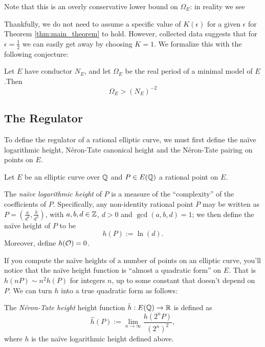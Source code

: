 \documentclass[10pt]{article}
\begin{document}
Note that this is an overly conservative lower bound on $\Omega_E$: in reality we see

Thankfully, we do not need to assume a specific value of $K(\epsilon)$ for a given $\epsilon$ for Theorem \ref{thm:main_theorem} to hold. However, collected data suggests that for $\epsilon=\frac{1}{2}$ we can easily get away by choosing $K = 1$. We formalize this with the following conjecture:
\begin{conjecture}
Let $E$ have conductor $N_E$, and let $\Omega_E$ be the real period of a minimal model of $E$.Then 
\begin{equation}
\Omega_E > (N_E)^{-2}
\end{equation}
\end{conjecture}



\newpage
\subsection{The Regulator}

To define the regulator of a rational elliptic curve, we must first define the na\"ive logarithmic height, N\'eron-Tate canonical height and the N\'eron-Tate pairing on points on $E$.

Let $E$ be an elliptic curve over $\mathbb{Q}$ and $P \in E(\mathbb{Q})$ a rational point on $E$. 

\begin{definition}
The {\it na\"ive logarithmic height} of $P$ is a measure of the ``complexity'' of the coefficients of $P$. Specifically, any non-identity rational point $P$ may be written as $P = (\frac{a}{d^2},\frac{b}{d^3})$, with $a,b,d \in \mathbb{Z}$, $d>0$ and $\gcd(a,b,d) = 1$; we then define the na\"ive height of $P$ to be
\begin{equation}
	h(P) := \ln(d).
\end{equation}
Moreover, define $h(\mathcal{O}) = 0$.
\end{definition}
If you compute the na\"ive heights of a number of points on an elliptic curve, you'll notice that the na\"ive height function is ``almost a quadratic form'' on $E$. That is $h(nP) \sim n^2 h(P)$ for integers $n$, up to some constant that doesn't depend on $P$. We can turn $h$ into a true quadratic form as follows:

\begin{definition}
The {\it N\'eron-Tate height} height function $\hat{h}: E(\mathbb{Q}) \to \mathbb{R}$ is defined as
\begin{equation}
	\hat{h}(P) := \lim_{n \to \infty} \frac{h(2^n P)}{(2^n)^2},
\end{equation}
where $h$ is the na\"ive logarithmic height defined above.
\end{definition}
\end{document}
